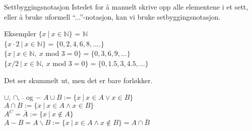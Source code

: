 \begin{frame}[fragile]{Settbyggingsnotasjon}
    Istedet for å manuelt skrive opp alle elementene i et sett, eller å bruke uformell \enquote{...}-notasjon, kan vi bruke setbyggingsnotasjon.
    \begin{block}{Eksempler}
        $\{ x ~ | ~ x \in \mathbb{N}\}$ = $\mathbb{N}$\\
        $\{ x \cdot 2 ~ | ~ x \in \mathbb{N}\}$ = $\{0, 2, 4, 6, 8, ....\}$\\
        $\{x ~ | ~ x \in \mathbb{N}, ~ x$ mod $3 = 0 \} = \{0, 3, 6, 9, ...\}$\\
        $\{x/2 ~ | ~ x \in \mathbb{N}, ~ x$ mod $3 = 0\} = \{0, 1.5, 3, 4.5, ...\}$
    \end{block}
    \pause
    Det ser skummelt ut, men det er bare forløkker.
\end{frame} 

\begin{frame}{$\cup$, $\cap$, $\bar{}$ og $-$}
    $A \cup B := \{x ~ | ~ x \in A \lor x \in B\}$ \\
    $A \cap B := \{x ~ | ~ x \in A \land x \in B\}$\\
    $A^C = \bar{A} := \{x ~ | ~ x \notin A\}$\\
    $A - B = A \backslash B := \{x ~ | ~ x \in A \land  x \notin B\} = A \cap \bar{B}$
    
    \begin{figure}%
        \centering
        \qquad
        \qquad
        \qquad
        \label{fig:example2}%
    \end{figure}
\end{frame}

